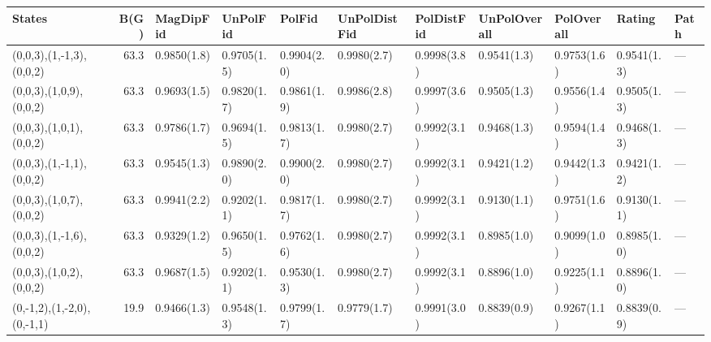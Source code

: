 \begin{tabular}{lrlllllllll}
\hline
 States                     &   B(G) & MagDipFid   & UnPolFid    & PolFid      & UnPolDistFid   & PolDistFid   & UnPolOverall   & PolOverall   & Rating      & Path   \\
\hline
 (0,0,3),(1,-1,3),(0,0,2)   &   63.3 & 0.9850(1.8) & 0.9705(1.5) & 0.9904(2.0) & 0.9980(2.7)    & 0.9998(3.8)  & 0.9541(1.3)    & 0.9753(1.6)  & 0.9541(1.3) & ---    \\
 (0,0,3),(1,0,9),(0,0,2)    &   63.3 & 0.9693(1.5) & 0.9820(1.7) & 0.9861(1.9) & 0.9986(2.8)    & 0.9997(3.6)  & 0.9505(1.3)    & 0.9556(1.4)  & 0.9505(1.3) & ---    \\
 (0,0,3),(1,0,1),(0,0,2)    &   63.3 & 0.9786(1.7) & 0.9694(1.5) & 0.9813(1.7) & 0.9980(2.7)    & 0.9992(3.1)  & 0.9468(1.3)    & 0.9594(1.4)  & 0.9468(1.3) & ---    \\
 (0,0,3),(1,-1,1),(0,0,2)   &   63.3 & 0.9545(1.3) & 0.9890(2.0) & 0.9900(2.0) & 0.9980(2.7)    & 0.9992(3.1)  & 0.9421(1.2)    & 0.9442(1.3)  & 0.9421(1.2) & ---    \\
 (0,0,3),(1,0,7),(0,0,2)    &   63.3 & 0.9941(2.2) & 0.9202(1.1) & 0.9817(1.7) & 0.9980(2.7)    & 0.9992(3.1)  & 0.9130(1.1)    & 0.9751(1.6)  & 0.9130(1.1) & ---    \\
 (0,0,3),(1,-1,6),(0,0,2)   &   63.3 & 0.9329(1.2) & 0.9650(1.5) & 0.9762(1.6) & 0.9980(2.7)    & 0.9992(3.1)  & 0.8985(1.0)    & 0.9099(1.0)  & 0.8985(1.0) & ---    \\
 (0,0,3),(1,0,2),(0,0,2)    &   63.3 & 0.9687(1.5) & 0.9202(1.1) & 0.9530(1.3) & 0.9980(2.7)    & 0.9992(3.1)  & 0.8896(1.0)    & 0.9225(1.1)  & 0.8896(1.0) & ---    \\
 (0,-1,2),(1,-2,0),(0,-1,1) &   19.9 & 0.9466(1.3) & 0.9548(1.3) & 0.9799(1.7) & 0.9779(1.7)    & 0.9991(3.0)  & 0.8839(0.9)    & 0.9267(1.1)  & 0.8839(0.9) & ---    \\
\hline
\end{tabular}
